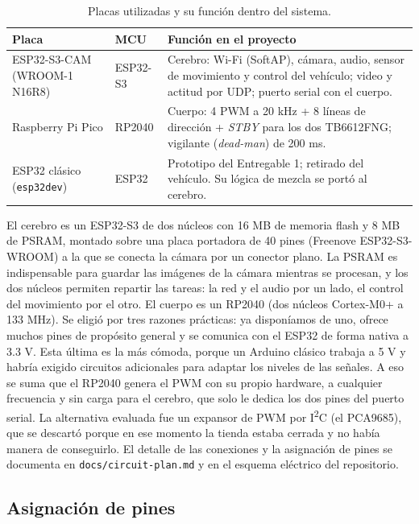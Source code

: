 \documentclass[journal]{IEEEtran}
\begin{document}
\begin{table}[htbp]
\centering
\caption{Placas utilizadas y su función dentro del sistema.}
\label{tab:placas}
\small
\begin{tabular}{@{}>{\raggedright\arraybackslash}p{2.3cm}>{\raggedright\arraybackslash}p{1.3cm}>{\raggedright\arraybackslash}p{4.2cm}@{}}
\toprule
\textbf{Placa} & \textbf{MCU} & \textbf{Función en el proyecto} \\
\midrule
ESP32-S3-CAM (WROOM-1 N16R8) & ESP32-S3 & Cerebro: Wi-Fi (SoftAP), cámara, audio, sensor de movimiento y control del vehículo; video y actitud por UDP; puerto serial con el cuerpo. \\
\midrule
Raspberry Pi Pico & RP2040 & Cuerpo: 4 PWM a 20 kHz + 8 líneas de dirección + \emph{STBY} para los dos TB6612FNG; vigilante (\emph{dead-man}) de 200 ms. \\
\midrule
ESP32 clásico (\texttt{esp32dev}) & ESP32 & Prototipo del Entregable 1; retirado del vehículo. Su lógica de mezcla se portó al cerebro. \\
\bottomrule
\end{tabular}
\end{table}

El cerebro es un ESP32-S3 de dos núcleos con 16 MB de memoria flash y 8 MB de PSRAM, montado sobre una placa portadora de 40 pines (Freenove ESP32-S3-WROOM) a la que se conecta la cámara por un conector plano. La PSRAM es indispensable para guardar las imágenes de la cámara mientras se procesan, y los dos núcleos permiten repartir las tareas: la red y el audio por un lado, el control del movimiento por el otro. El cuerpo es un RP2040 (dos núcleos Cortex-M0+ a 133 MHz). Se eligió por tres razones prácticas: ya disponíamos de uno, ofrece muchos pines de propósito general y se comunica con el ESP32 de forma nativa a 3.3 V. Esta última es la más cómoda, porque un Arduino clásico trabaja a 5 V y habría exigido circuitos adicionales para adaptar los niveles de las señales. A eso se suma que el RP2040 genera el PWM con su propio hardware, a cualquier frecuencia y sin carga para el cerebro, que solo le dedica los dos pines del puerto serial. La alternativa evaluada fue un expansor de PWM por I\textsuperscript{2}C (el PCA9685), que se descartó porque en ese momento la tienda estaba cerrada y no había manera de conseguirlo. El detalle de las conexiones y la asignación de pines se documenta en \texttt{docs/circuit-plan.md} y en el esquema eléctrico del repositorio.

\subsection{Asignación de pines}
\end{document}
